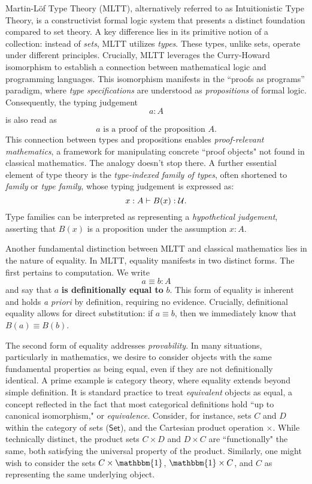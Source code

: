 \documentclass[main.tex]{subfiles}
\begin{document}
Martin-Löf Type Theory (MLTT), alternatively referred to as Intuitionistic Type Theory, is a constructivist formal logic system that presents a distinct foundation compared to set theory. A key difference lies in its primitive notion of a collection: instead of \textit{sets}, MLTT utilizes \textit{types}. These types, unlike sets, operate under different principles. Crucially, MLTT leverages the Curry-Howard isomorphism to establish a connection between mathematical logic and programming languages. This isomorphism manifests in the ``proofs as programs'' paradigm, where \textit{type specifications} are understood as \textit{propositions} of formal logic. Consequently, the typing judgement
\[ a : A \]
is also read as
\[
a \text{ is a proof of the proposition } A.
\]
This connection between types and propositions enables \textit{proof-relevant mathematics}, a framework for manipulating concrete ``proof objects" not found in classical mathematics. The analogy doesn't stop there. A further essential element of type theory is the \textit{type-indexed family of types}, often shortened to \textit{family} or \textit{type family}, whose typing judgement is expressed as:
\[
x : A \vdash B (x) : \mathcal{U}.
\]
Type families can be interpreted as representing a \textit{hypothetical judgement}, asserting that $B(x)$ is a proposition under the assumption $x:A$.

Another fundamental distinction between MLTT and classical mathematics lies in the nature of equality. In MLTT, equality manifests in two distinct forms. The first pertains to computation. We write \[ a \equiv b : A\] and say that $a$ \textbf{is definitionally equal to} $b$. This form of equality is inherent and holds \textit{a priori} by definition, requiring no evidence. Crucially, definitional equality allows for direct substitution: if $a \equiv b$, then we immediately know that $B(a) \equiv B(b)$.

The second form of equality addresses \textit{provability}. In many situations, particularly in mathematics, we desire to consider objects with the same fundamental properties as being equal, even if they are not definitionally identical. A prime example is category theory, where equality extends beyond simple definition. It is standard practice to treat \textit{equivalent} objects as equal, a concept reflected in the fact that most categorical definitions hold ``up to canonical isomorphism," or \textit{equivalence}. Consider, for instance, sets $C$ and $D$ within the category of sets ($\mathsf{Set}$), and the Cartesian product operation $\times$. While technically distinct, the product sets $C \times D$ and $D \times C$ are ``functionally" the same, both satisfying the universal property of the product. Similarly, one might wish to consider the sets $C \times \mathbbm{1}$, $\mathbbm{1} \times C$, and $C$ as representing the same underlying object.
\end{document}
